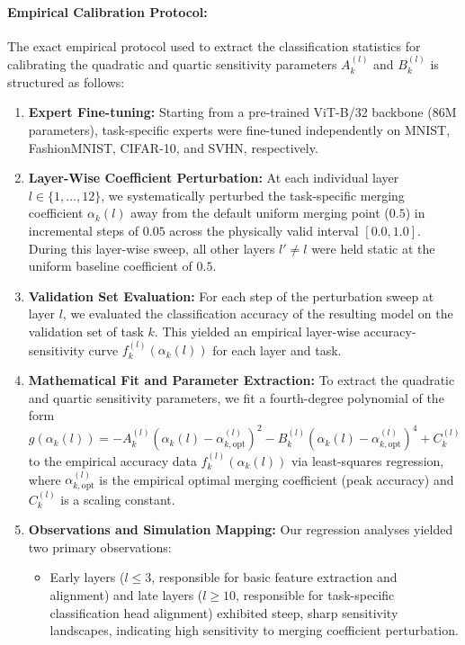 \paragraph{Empirical Calibration Protocol:} 
The exact empirical protocol used to extract the classification statistics for calibrating the quadratic and quartic sensitivity parameters $A_k^{(l)}$ and $B_k^{(l)}$ is structured as follows:
\begin{enumerate}
    \item \textbf{Expert Fine-tuning:} Starting from a pre-trained ViT-B/32 backbone (86M parameters), task-specific experts were fine-tuned independently on MNIST, FashionMNIST, CIFAR-10, and SVHN, respectively.
    \item \textbf{Layer-Wise Coefficient Perturbation:} At each individual layer $l \in \{1, \dots, 12\}$, we systematically perturbed the task-specific merging coefficient $\alpha_k(l)$ away from the default uniform merging point ($0.5$) in incremental steps of $0.05$ across the physically valid interval $[0.0, 1.0]$.
During this layer-wise sweep, all other layers $l' \neq l$ were held static at the uniform baseline coefficient of $0.5$.
    \item \textbf{Validation Set Evaluation:} For each step of the perturbation sweep at layer $l$, we evaluated the classification accuracy of the resulting model on the validation set of task $k$.
This yielded an empirical layer-wise accuracy-sensitivity curve $f_k^{(l)}(\alpha_k(l))$ for each layer and task.
    \item \textbf{Mathematical Fit and Parameter Extraction:} To extract the quadratic and quartic sensitivity parameters, we fit a fourth-degree polynomial of the form $g(\alpha_k(l)) = - A_k^{(l)} \left( \alpha_k(l) - \alpha_{k, \text{opt}}^{(l)} \right)^2 - B_k^{(l)} \left( \alpha_k(l) - \alpha_{k, \text{opt}}^{(l)} \right)^4 + C_k^{(l)}$ to the empirical accuracy data $f_k^{(l)}(\alpha_k(l))$ via least-squares regression, where $\alpha_{k, \text{opt}}^{(l)}$ is the empirical optimal merging coefficient (peak accuracy) and $C_k^{(l)}$ is a scaling constant. 
    \item \textbf{Observations and Simulation Mapping:} Our regression analyses yielded two primary observations:
    \begin{itemize}
        \item Early layers ($l \le 3$, responsible for basic feature extraction and alignment) and late layers ($l \ge 10$, responsible for task-specific classification head alignment) exhibited steep, sharp sensitivity landscapes, indicating high sensitivity to merging coefficient perturbation.

\end{itemize}
\end{enumerate}
